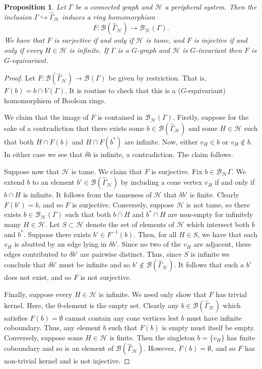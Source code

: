 \documentclass[11pt,a4paper]{amsart}
\newcommand{\into}{\hookrightarrow}
\newtheorem{proposition}[theorem]{Proposition}
\theoremstyle{definition}
\newcommand{\per}{\mathcal{H}}
\newcommand{\br}{{\mathscr{B}}}
\begin{document}
\begin{proposition}\label{prop:ring-isomorphism}
    Let $\Gamma$ be a connected graph and $\per$ a peripheral system. Then the inclusion $\Gamma \into \widehat \Gamma_\per$ induces a ring homomorphism
    $$
    F : \br (\widehat \Gamma_{\per}) \to \br_{\per} (\Gamma). 
    $$
    We have that $F$ is surjective if and only if $\per$ is tame, and $F$ is injective if and only if every $H \in \per$ is infinite. If $\Gamma$ is a $G$-graph and $\per$ is $G$-invariant then $F$ is $G$-equivariant. 
\end{proposition}


\begin{proof}
    Let $F : \br (\widehat \Gamma_{\per}) \to \br (\Gamma)$ be given by restriction. That is, 
    $F(b) = b \cap V(\Gamma) $.
    It is routine to check that this is a ($G$-equivariant) homomorphism of Boolean rings. 
    
    We claim that the image of $F$ is contained in $\br_{\per} (\Gamma)$. Firstly, suppose for the sake of a contradiction that there exists some $b \in \br (\widehat \Gamma_{\per})$ and some $H \in \per$ such that both $H \cap F(b)$ and $H \cap F(b^\ast)$ are infinite. Now, either $v_H \in b$ or $v_H \not\in b$. In either case we see that $\delta b$ is infinite, a contradiction. The claim follows. 

    Suppose now that $\per$ is tame. We claim that $F$ is surjective. Fix $b \in \br_\per \Gamma$. We extend $b$ to an element $b' \in \br (\widehat \Gamma_{\per})$ by including a cone vertex $v_H$ if and only if $b \cap H$ is infinite. It follows from the tameness of $\per$ that $\delta b'$ is finite. Clearly $F(b') = b$, and so $F$ is surjective. Conversely, suppose $\per$ is not tame, so there exists $b \in \br_\per(\Gamma)$ such that both $b \cap H$ and $b^\ast \cap H$ are non-empty for infinitely many $H \in \per$. Let $S\subset \per$ denote the set of elements of $\per$ which intersect both $b$ and $b^\ast$.  Suppose there exists $b' \in F^{-1}(b)$. Then, for all $H \in S$, we have that each $v_H$ is abutted by an edge lying in $\delta b'$. Since no two of the $v_H$ are adjacent, these edges contributed to $\delta b'$ are pairwise distinct. Thus, since $S$ is infinite we conclude that $\delta b'$ must be infinite and so $b' \not\in \br(\widehat \Gamma _\per)$. It follows that such a $b'$ does not exist, and so $F$ is not surjective. 

    Finally, suppose every $H \in \per$ is infinite. We need only show that $F$ has trivial kernel. Here, the 0-element is the empty set. Clearly any $b \in \br(\widehat \Gamma_\per)$ which satisfies $F(b) = \emptyset$ cannot contain any cone vertices lest $b$ must have infinite coboundary. Thus, any element $b$ such that $F(b)$ is empty must itself be empty. Conversely, suppose some $H \in \per$ is finite. Then the singleton $b = \{v_H\}$ has finite coboundary and so is an element of $\br(\widehat \Gamma_\per)$. However, $F(b) = \emptyset$, and so $F$ has non-trivial kernel and is not injective.
\end{proof}
\end{document}
